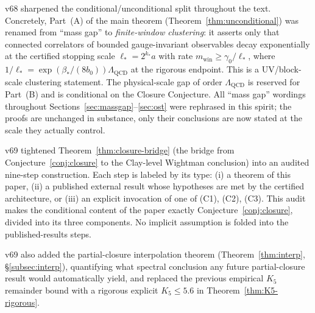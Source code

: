 \documentclass[11pt]{article}
\theoremstyle{definition}
\newcommand{\Lam}{\Lambda_{\mathrm{QCD}}}
\begin{document}
v68 sharpened the conditional/unconditional split throughout the
text.  Concretely, Part~(A) of the main theorem
(Theorem~\ref{thm:unconditional}) was renamed from ``mass gap'' to
\emph{finite-window clustering}: it asserts only that connected
correlators of bounded gauge-invariant observables decay
exponentially at the certified stopping scale $\ell_*=2^{k_*}a$ with
rate $m_{\mathrm{win}}\ge\gamma_0/\ell_*$, where $1/\ell_*=\exp(\beta_*/(8b_0))\Lam$
at the rigorous endpoint.  This is a UV/block-scale clustering
statement.  The physical-scale gap of order $\Lam$ is reserved for
Part~(B) and is conditional on the Closure Conjecture.  All
``mass gap'' wordings throughout Sections~\ref{sec:massgap}--\ref{sec:ost}
were rephrased in this spirit; the proofs are unchanged in substance,
only their conclusions are now stated at the scale they actually
control.

v69 tightened Theorem~\ref{thm:closure-bridge} \textup{(}the bridge
from Conjecture~\ref{conj:closure} to the Clay-level Wightman
conclusion\textup{)} into an audited nine-step construction.  Each
step is labeled by its type: \textup{(i)} a theorem of this paper,
\textup{(ii)} a published external result whose hypotheses are met by
the certified architecture, or \textup{(iii)} an explicit invocation
of one of \textup{(C1)}, \textup{(C2)}, \textup{(C3)}.  This audit
makes the conditional content of the paper exactly
Conjecture~\ref{conj:closure}, divided into its three components.  No
implicit assumption is folded into the published-results steps.

v69 also added the partial-closure interpolation theorem
\textup{(}Theorem~\ref{thm:interp}, \S\ref{subsec:interp}\textup{)},
quantifying what spectral conclusion any future partial-closure
result would automatically yield, and replaced the previous
empirical $K_5$ remainder bound with a rigorous explicit
$K_5\le 5.6$ in Theorem~\ref{thm:K5-rigorous}.
\end{document}
